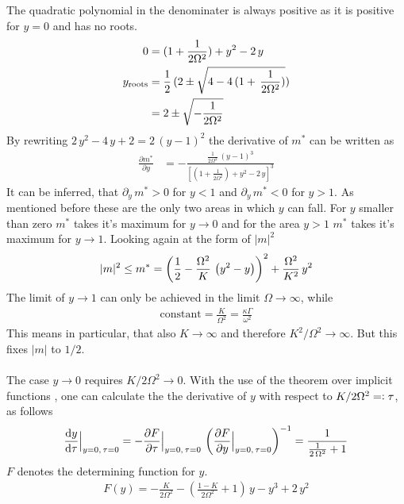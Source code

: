     The quadratic polynomial in the denominater is always positive as it is positive for $y=0$ and has no roots.
    \begin{align*}
        0&=(1+\frac{1}{2\Omega^2})+{y}^2-2\,{y}\\
        y_\text{roots}&=\frac{1}{2}\,(2\pm\sqrt{4-4\,(1+\,\frac{1}{2\Omega^2})})\\
        &=2\pm\sqrt{-\frac{1}{2\Omega^2}}
    \end{align*}
    By rewriting $2\,y^2-4\,y+2=2\,(y-1)^2$ the derivative of $m^*$ can be written as
    \begin{align*}
        \frac{\partial m^*}{\partial{y}}&=-\frac{\frac{1}{2\Omega^2}\,({y}-1)^3}{\left[(1+\frac{1}{2\Omega^2})+{y}^2-2\,{y}\right]^3}
    \end{align*}
    It can be inferred, that $\partial_{{y}}\,m^*>0$ for ${y}<1$ and $\partial_{{y}}\,m^*<0$ for ${y}>1$. As mentioned before these are the only two areas in which ${y}$ can fall. For $y$ smaller than zero $m^*$ takes it's maximum for ${y}\rightarrow0$ and for the area ${y}>1$ $m^*$ takes it's maximum for ${y}\rightarrow1$. Looking again at the form of $|m|^2$ 
    \begin{align*}
        |m|^2\leq m^*=\left( \frac{1}{2}-\frac{\Omega^2}{K}\,\left( {y}^2- {y} \right) \right)^2+\frac{\Omega^2}{K^2}\,{y}^2
    \end{align*}
    The limit of ${y}\rightarrow1$ can only be achieved in the limit $\Omega\rightarrow\infty$, while%
    \begin{align*}
        \text{constant}=\frac{K}{\Omega^2}=\frac{\kappa\Gamma}{\omega^2}
    \end{align*}
    This means in particular, that also $K\rightarrow\infty$ and therefore $K^2/\Omega^2\rightarrow\infty$. But this fixes $|m|$ to $1/2$. \\\\
    The case $y\rightarrow0$ requires $K/2\Omega^2\rightarrow0$. With the use of the theorem over implicit functions \cite{deitmar_analysis_2021}, one can calculate the the derivative of $y$ with respect to $K/2\Omega^2=\vcentcolon\tau$, as follows
    \begin{align*}
        \frac{\text{d} y}{\text{d}\tau}\Big|_{y=0,\,\tau=0}=-\frac{\partial F}{\partial\tau}\Big|_{y=0,\,\tau=0}\,\left(\frac{\partial F}{\partial y}\Big|_{y=0,\,\tau=0}\right)^{-1}=\frac{1}{\frac{1}{2\,\Omega^2}+1}
    \end{align*}
    $F$ denotes the determining function for $y$. 
    \begin{align*}
        F(y)=-\frac{K}{2\Omega^2}-\left( \frac{1-K}{2\Omega^2} +1\right)\,{y}-{y}^3+2\,{y}^2
    \end{align*}
